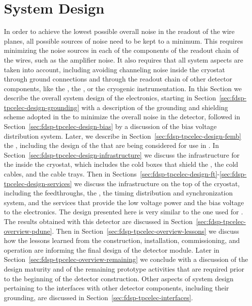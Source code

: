\section{System Design}
\label{sec:fdsp-tpcelec-design}

In order to achieve the lowest possible overall noise in the readout of 
the  wire planes, all possible sources of noise need to be kept to a
minimum. This requires minimizing the noise sources in each
of the components of the readout chain of the  wires, such as
the  amplifier noise. It also requires that all system aspects
are taken into account, including avoiding channeling noise inside
the cryostat through ground connections and through the readout
chain of other detector components, like the , the ,
or the cryogenic instrumentation. In this Section we describe the overall
system design of the  electronics, starting in
Section~\ref{sec:fdsp-tpcelec-design-grounding} with a description of the
grounding and shielding scheme adopted in the  
to minimize the overall noise in the detector, followed in 
Section~\ref{sec:fdsp-tpcelec-design-bias} by a discussion of the bias
voltage distribution system. Later, we describe in
Section~\ref{sec:fdsp-tpcelec-design-femb} the , including
the design of the  that are being considered for
use in . In Section~\ref{sec:fdsp-tpcelec-design-infrastructure}
we discuss the infrastructure for the  inside the cryostat,
which includes the cold boxes that shield the , the
cold cables, and the cable trays. Then in 
Sections~\ref{sec:fdsp-tpcelec-design-ft}-\ref{sec:fdsp-tpcelec-design-services} we discuss 
the infrastructure on the top of the cryostat, including the
feedthroughs, the , the timing distribution and
synchronization system, and the services that provide the low
voltage power and the bias voltage to the  electronics. 
The design presented here is very similar to the one used for
. The results obtained with this detector are 
discussed in Section~\ref{sec:fdsp-tpcelec-overview-pdune}.
Then in Section~\ref{sec:fdsp-tpcelec-overview-lessons} we discuss
how the lessons learned from the construction, installation,
commissioning, and operation are informing the final design
of the   detector module. Later in
Section~\ref{sec:fdsp-tpcelec-overview-remaining} we conclude
with a discussion of the design maturity and of
the remaining prototype activities that are required prior to
the beginning of the detector construction. Other aspects of system
design pertaining to the interfaces with other detector components, including
their grounding, are discussed in Section~\ref{sec:fdsp-tpcelec-interfaces}.

